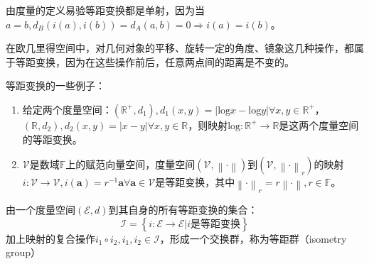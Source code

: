 \documentclass[main.tex]{subfiles}
\begin{document}
由度量的定义易验等距变换都是单射，因为当$a=b,d_B\left(i\left(a\right),i\left(b\right)\right)=d_A\left(a,b\right)=0\Rightarrow i\left(a\right)=i\left(b\right)$。

在欧几里得空间中，对几何对象的平移、旋转一定的角度、镜象这几种操作，都属于等距变换，因为在这些操作前后，任意两点间的距离是不变的。

\begin{example}
等距变换的一些例子：
\begin{enumerate}
    \item 给定两个度量空间：$\left(\mathbb{R}^+,d_1\right),d_1\left(x,y\right)=\left|\mathrm{log}x-\mathrm{log}y\right|\forall x,y\in\mathbb{R}^+$，$\left(\mathbb{R},d_2\right),d_2\left(x,y\right)=\left|x-y\right|\forall x,y\in\mathbb{R}$，则映射$\mathrm{log}:\mathbb{R}^+\rightarrow\mathbb{R}$是这两个度量空间的等距变换。
    \item $\mathcal{V}$是数域$\mathbb{F}$上的赋范向量空间，度量空间$\left(\mathcal{V},\left\|\cdot\right\|\right)$到$\left(\mathcal{V},\left\|\cdot\right\|_r\right)$的映射$i:\mathcal{V}\rightarrow\mathcal{V},i\left(\mathbf{a}\right)=r^{-1}\mathbf{a}\forall\mathbf{a}\in\mathcal{V}$是等距变换，其中$\left\|\cdot\right\|_r=r\left\|\cdot\right\|,r\in\mathbb{F}$。
\end{enumerate}
\end{example}

\begin{definition}[等距群]
由一个度量空间$\left(\mathcal{E},d\right)$到其自身的所有等距变换的集合：
\[\mathcal{I}=\left\{i:\mathcal{E}\rightarrow\mathcal{E}|i\text{是等距变换}\right\}\]
加上映射的复合操作$i_1\circ i_2,i_1,i_2\in\mathcal{I}$，形成一个交换群，称为等距群（isometry group）
\end{definition}
\end{document}
